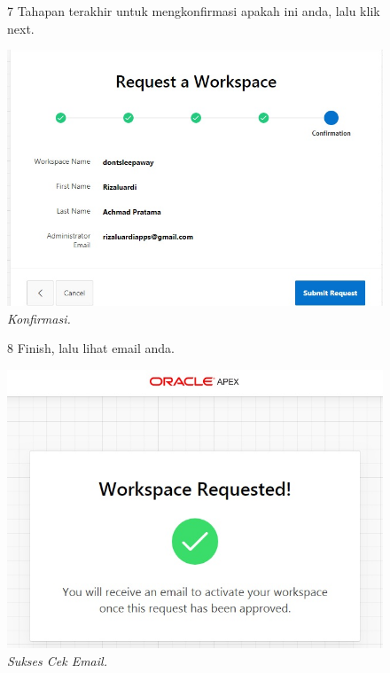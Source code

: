 \begin{enumerate}
\begin{figure}
\label{gambar}
\end{figure}

\begin{figure}
\item[7] Tahapan terakhir untuk mengkonfirmasi apakah ini anda, lalu klik next.

    \begin{center}
\includegraphics[scale=0.5]{figures/req5.jpg}
    \caption{\textit{Konfirmasi.}}
        \end{center}
\label{gambar}
\end{figure}

\begin{figure}
\item[8] Finish, lalu lihat email anda.

    \begin{center}
\includegraphics[scale=0.5]{figures/req6.jpg}
    \caption{\textit{Sukses Cek Email.}}
        \end{center}
\label{gambar}
\end{figure}


\end{enumerate}

